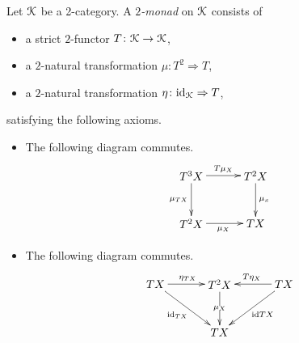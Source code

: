 \begin{Defi}[($2$-monad)]\label{Defi:2monad}
Let $\mathcal{K}$ be a 2-category. A \emph{$2$-monad} on $\mathcal{K}$ consists of
    \begin{itemize}
        \item a strict $2$-functor $T \colon \mathcal{K} \rightarrow \mathcal{K}$,
        \item a $2$-natural transformation $\mu \colon T^2 \Rightarrow T$,
        \item a $2$-natural transformation $\eta \colon \textrm{id}_{\mathcal{K}} \Rightarrow T$,
    \end{itemize}
satisfying the following axioms.
    \begin{itemize}
        \item The following diagram commutes.
        \[
            \xy
                (0,0)*+{T^3X}="00";
                (20,0)*+{T^2X}="10";
                (0,-15)*+{T^2X}="01";
                (20,-15)*+{TX}="11";
                {\ar^{T\mu_X} "00" ; "10"};
                {\ar^{\mu_x} "10" ; "11"};
                {\ar_{\mu_{TX}} "00" ;  "01"};
                {\ar_{\mu_X} "01" ; "11"};
            \endxy
        \]
        \item The following diagram commutes.
        \[
            \xy
                (0,0)*+{TX}="00";
                (20,0)*+{T^2X}="10";
                (40,0)*+{TX}="20";
                (20,-15)*+{TX}="11";
                {\ar^{\eta_{TX}} "00" ; "10"};
                {\ar_{T\eta_X} "20" ; "10"};
                {\ar|{\mu_X} "10" ; "11"};
                {\ar_{\id_{TX}} "00" ; "11"};
                {\ar^{\id{TX}} "20" ; "11"};
            \endxy
        \]
\end{itemize}
\end{Defi}

